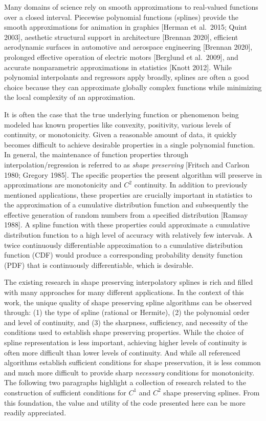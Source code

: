 
Many domains of science rely on smooth approximations to real-valued
functions over a closed interval. Piecewise polynomial functions
(splines) provide the smooth approximations for animation in graphics
[Herman et al.\ 2015; Quint 2003], aesthetic structural support in
architecture [Brennan 2020], efficient aerodynamic surfaces in
automotive and aerospace engineering [Brennan 2020], prolonged
effective operation of electric motors [Berglund et al.\ 2009], and
accurate nonparametric approximations in statistics [Knott
2012]. While polynomial interpolants and regressors apply broadly,
splines are often a good choice because they can approximate globally
complex functions while minimizing the local complexity of an
approximation.

It is often the case that the true underlying function or phenomenon
being modeled has known properties like convexity, positivity,
various levels of continuity, or monotonicity. Given a reasonable
amount of data, it quickly becomes difficult to achieve desirable
properties in a single polynomial function. In general, the
maintenance of function properties through interpolation/regression is
referred to as {\it shape preserving} [Fritsch and Carlson 1980;
Gregory 1985]. The specific properties the present algorithm will
preserve in approximations are monotonicity and $C^2$ continuity. In
addition to previously mentioned applications, these properties are
crucially important in statistics to the approximation of a cumulative
distribution function and subsequently the effective generation of
random numbers from a specified distribution [Ramsay 1988].  A spline
function with these properties could approximate a cumulative
distribution function to a high level of accuracy with relatively few
intervals. A twice continuously differentiable approximation to a
cumulative distribution function (CDF) would produce a corresponding
probability density function (PDF) that is continuously
differentiable, which is desirable.

The existing research in shape preserving interpolatory splines is
rich and filled with many approaches for many different
applications. In the context of this work, the unique quality of shape
preserving spline algorithms can be observed through: (1) the type of
spline (rational or Hermite), (2) the polynomial order and level of
continuity, and (3) the sharpness, sufficiency, and necessity of the
conditions used to establish shape preserving properties. While the
choice of spline representation is less important, achieving higher
levels of continuity is often more difficult than lower levels of
continuity. And while all referenced algorithms establish sufficient
conditions for shape preservation, it is less common and much more
difficult to provide sharp {\it necessary} conditions for
monotonicity. The following two paragraphs highlight a collection of
research related to the construction of sufficient conditions for
$C^1$ and $C^2$ shape preserving splines. From this foundation, the
value and utility of the code presented here can be more readily
appreciated.

